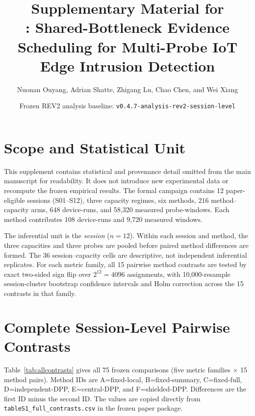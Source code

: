 \documentclass[10pt]{article}
\title{Supplementary Material for\\
\NetShield{}: Shared-Bottleneck Evidence Scheduling for Multi-Probe IoT Edge Intrusion Detection}
\author{Nuonan Ouyang, Adrian Shatte, Zhigang Lu, Chao Chen, and Wei Xiang}
\date{Frozen REV2 analysis baseline: \texttt{v0.4.7-analysis-rev2-session-level}}
\begin{document}
\maketitle
\small

\section{Scope and Statistical Unit}
This supplement contains statistical and provenance detail omitted from the main manuscript for readability. It does not introduce new experimental data or recompute the frozen empirical results. The formal campaign contains 12 paper-eligible sessions (S01--S12), three capacity regimes, six methods, 216 method--capacity arms, 648 device-runs, and 58,320 measured probe-windows. Each method contributes 108 device-runs and 9,720 measured windows.

The inferential unit is the \emph{session} ($n=12$). Within each session and method, the three capacities and three probes are pooled before paired method differences are formed. The 36 session--capacity cells are descriptive, not independent inferential replicates. For each metric family, all 15 pairwise method contrasts are tested by exact two-sided sign flip over $2^{12}=4096$ assignments, with 10,000-resample session-cluster bootstrap confidence intervals and Holm correction across the 15 contrasts in that family.

\section{Complete Session-Level Pairwise Contrasts}
Table~\ref{tab:allcontrasts} gives all 75 frozen comparisons (five metric families $\times$ 15 method pairs). Method IDs are A=fixed-local, B=fixed-summary, C=fixed-full, D=independent-DPP, E=central-DPP, and F=shielded-DPP. Differences are the first ID minus the second ID. The values are copied directly from \texttt{tableS1\_full\_contrasts.csv} in the frozen paper package.
\end{document}
